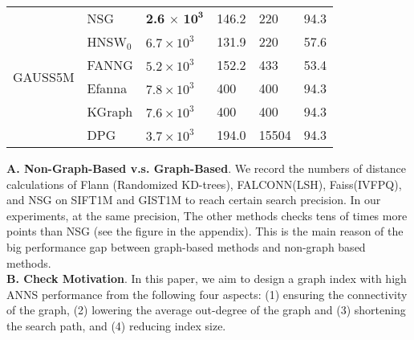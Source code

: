 \documentclass{vldb}
\begin{document}
\begin{table}[t]
\begin{tabular}{|p{1.2cm}<{\centering}|p{1.2cm}<{\centering}|p{1.5cm}<{\centering}|p{0.7cm}<{\centering}|p{0.6cm}<{\centering}|p{0.7cm}<{\centering}|}
\multirow{6}{*}{GAUSS5M} 
& NSG & \textbf{2.6} $\times$ $\textbf{10}^\textbf{3}$ &146.2 & 220 &94.3\\
\cline{2-6}
& HNSW$_0$ & $6.7 \times 10^3 $ &131.9&220 &57.6\\
\cline{2-6}
& FANNG & $5.2 \times 10^3 $ &152.2& 433 &53.4\\
\cline{2-6}
& Efanna & $7.8 \times 10^3 $ &400&400 &94.3\\
\cline{2-6}
& KGraph & $7.6 \times 10^3 $ &400&400 &94.3\\
\cline{2-6}
& DPG & $3.7 \times 10^3$ & 194.0& 15504 &94.3\\
\hline
\end{tabular}
\end{table}


\textbf{A. Non-Graph-Based v.s. Graph-Based}. We record the numbers of distance calculations of Flann (Randomized KD-trees), FALCONN(LSH), Faiss(IVFPQ), and NSG on SIFT1M and GIST1M to reach certain search precision. In our experiments, at the same precision, The other methods checks tens of times more points than NSG (see the figure in the appendix). This is the main reason of the big performance gap between graph-based methods and non-graph based methods.
\\

\textbf{B. Check Motivation}. In this paper, we aim to design a graph index with high ANNS performance from the following four aspects: (1) ensuring the connectivity of the graph, (2) lowering the average out-degree of the graph and (3) shortening the search path, and (4) reducing index size. 
\end{document}
